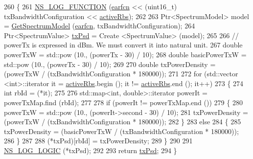 \begin{DoxyCode}
260 \{
261   \hyperlink{log-macros-disabled_8h_a90b90d5bad1f39cb1b64923ea94c0761}{NS\_LOG\_FUNCTION} (\hyperlink{generate__test__data__lte__spectrum__model_8m_a584be7562abb392609629331f8c6c42c}{earfcn} << (uint16\_t) txBandwidthConfiguration << 
      \hyperlink{generate__test__data__lte__spectrum__value__txpsd_8m_a24a77723355dffcf07f2679649d46828}{activeRbs});
262 
263   Ptr<SpectrumModel> model = \hyperlink{classns3_1_1LteSpectrumValueHelper_a8b8e37e31ac9bcf4e3fa2d69ad931e0e}{GetSpectrumModel} (\hyperlink{generate__test__data__lte__spectrum__model_8m_a584be7562abb392609629331f8c6c42c}{earfcn}, txBandwidthConfiguration);
264   Ptr<SpectrumValue> \hyperlink{lte__link__budget_8m_a684fe3101a5e48a5fcc57cab8dbcd1aa}{txPsd} = Create <SpectrumValue> (model);
265 
266   \textcolor{comment}{// powerTx is expressed in dBm. We must convert it into natural unit.}
267   \textcolor{keywordtype}{double} powerTxW = std::pow (10., (powerTx - 30) / 10);
268   \textcolor{keywordtype}{double} basicPowerTxW = std::pow (10., (powerTx - 30) / 10);
269 
270   \textcolor{keywordtype}{double} txPowerDensity = (powerTxW / (txBandwidthConfiguration * 180000));
271 
272   \textcolor{keywordflow}{for} (std::vector <int>::iterator it = \hyperlink{generate__test__data__lte__spectrum__value__txpsd_8m_a24a77723355dffcf07f2679649d46828}{activeRbs}.begin (); it != 
      \hyperlink{generate__test__data__lte__spectrum__value__txpsd_8m_a24a77723355dffcf07f2679649d46828}{activeRbs}.end (); it++)
273     \{
274       \textcolor{keywordtype}{int} rbId = (*it);
275 
276       std::map<int, double>::iterator powerIt = powerTxMap.find (rbId);
277 
278       \textcolor{keywordflow}{if} (powerIt != powerTxMap.end ())
279         \{
280           powerTxW = std::pow (10., (powerIt->second - 30) / 10);
281           txPowerDensity = (powerTxW / (txBandwidthConfiguration * 180000));
282         \}
283       \textcolor{keywordflow}{else}
284         \{
285           txPowerDensity = (basicPowerTxW / (txBandwidthConfiguration * 180000));
286         \}
287 
288       (*txPsd)[rbId] = txPowerDensity;
289     \}
290 
291   \hyperlink{group__logging_ga88acd260151caf2db9c0fc84997f45ce}{NS\_LOG\_LOGIC} (*txPsd);
292 
293   \textcolor{keywordflow}{return} \hyperlink{lte__link__budget_8m_a684fe3101a5e48a5fcc57cab8dbcd1aa}{txPsd};
294 \}
\end{DoxyCode}
